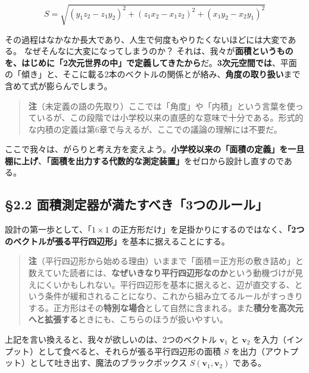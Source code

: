 \documentclass[a4paper,12pt,openany]{book}
\begin{document}
\[S = \sqrt{(y_1z_2 - z_1y_2)^2 + (z_1x_2 - x_1z_2)^2 + (x_1y_2 - x_2y_1)^2}\]

その過程はなかなか長大であり、人生で何度もやりたくないほどには大変である。
なぜそんなに大変になってしまうのか？
それは、我々が\textbf{面積というものを、はじめに「2次元世界の中」で定義してきたから}だ。\textbf{3次元空間では}、平面の「傾き」と、そこに載る2本のベクトルの関係とが絡み、\textbf{角度の取り扱い}まで含めて式が膨らんでしまう。

\begin{quote}
\textbf{注}（未定義の語の先取り）ここでは「角度」や「内積」という言葉を使っているが、この段階では小学校以来の直感的な意味で十分である。形式的な内積の定義は第6章で与えるが、ここでの議論の理解には不要だ。
\end{quote}

ここで我々は、がらりと考え方を変えよう。\textbf{小学校以来の「面積の定義」を一旦棚に上げ}、\textbf{「面積を出力する代数的な測定装置」}をゼロから設計し直すのである。

\par\vspace{0.35em}\par

\hypertarget{ux9762ux7a4dux6e2cux5b9aux5668ux304cux6e80ux305fux3059ux3079ux304d3ux3064ux306eux30ebux30fcux30eb}{%
\subsection{§2.2
面積測定器が満たすべき「3つのルール」}\label{ux9762ux7a4dux6e2cux5b9aux5668ux304cux6e80ux305fux3059ux3079ux304d3ux3064ux306eux30ebux30fcux30eb}}

設計の第一歩として、「\(1\times 1\)
の正方形だけ」を足掛かりにするのではなく、\textbf{「2つのベクトルが張る平行四辺形」}を基本に据えることにする。

\begin{quote}
\textbf{注}（平行四辺形から始める理由）いままで「面積＝正方形の敷き詰め」と数えていた読者には、\textbf{なぜいきなり平行四辺形なのか}という動機づけが見えにくいかもしれない。平行四辺形を基本に据えると、辺が直交する、という条件が緩和されることになり、これから組み立てるルールがすっきりする。正方形はその\textbf{特別な場合}として自然に含まれる。また\textbf{積分を高次元へと拡張する}ときにも、こちらのほうが扱いやすい。
\end{quote}

上記を言い換えると、我々が欲しいのは、2つのベクトル \(\mathbf{v}_1\) と
\(\mathbf{v}_2\)
を入力（インプット）として食べると、それらが張る平行四辺形の面積 \(S\)
を出力（アウトプット）として吐き出す、魔法のブラックボックス
\(S(\mathbf{v}_1, \mathbf{v}_2)\) である。
\end{document}
